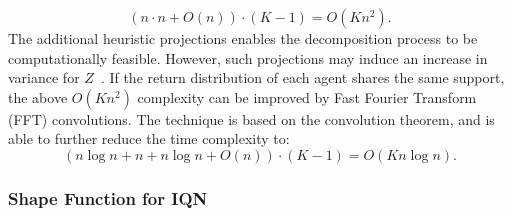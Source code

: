 \documentclass[twoside,11pt]{article}
\newcommand{\numberofagents}{K}
\newcounter{theorem0}
\begin{document}
\begin{equation}
    (n\cdot n + O(n))\cdot(\numberofagents{}-1)=O(\numberofagents{}n^2).
\end{equation}
The additional heuristic projections enables the decomposition process to be computationally feasible. However, such projections may induce an increase in variance for $Z$~\citep{Rowland2019ER-DQN}. If the return distribution of each agent shares the same support, the above $O(\numberofagents{}n^2)$ complexity can be improved by Fast Fourier Transform (FFT) convolutions. The technique is based on the convolution theorem, and is able to further reduce the time complexity to:
\begin{equation}
    (n\log n + n + n\log n + O(n))\cdot(\numberofagents{}-1)=O(\numberofagents{}n\log n).
\end{equation}
\subsubsection{Shape Function for IQN}
\end{document}
